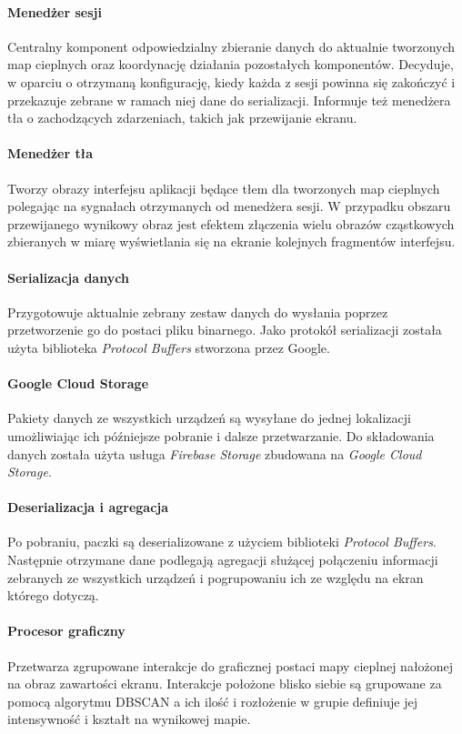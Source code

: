 \paragraph{Menedżer sesji} 
\label{par:rs_session_manager}
Centralny komponent odpowiedzialny zbieranie danych do aktualnie tworzonych map cieplnych oraz koordynację działania pozostałych komponentów. Decyduje, w oparciu o otrzymaną konfigurację, kiedy każda z sesji powinna się zakończyć i przekazuje zebrane w ramach niej dane do serializacji. Informuje też menedżera tła o zachodzących zdarzeniach, takich jak przewijanie ekranu.

\paragraph{Menedżer tła} 
\label{par:rs_bg_manager}
Tworzy obrazy interfejsu aplikacji będące tłem dla tworzonych map cieplnych polegając na sygnałach otrzymanych od menedżera sesji. W przypadku obszaru przewijanego wynikowy obraz jest efektem złączenia wielu  obrazów cząstkowych zbieranych w miarę wyświetlania się na ekranie kolejnych fragmentów interfejsu.

\paragraph{Serializacja danych}
Przygotowuje aktualnie zebrany zestaw danych do wysłania poprzez przetworzenie go do postaci pliku binarnego. Jako protokół serializacji została użyta biblioteka {\it Protocol Buffers} stworzona przez Google.

\paragraph{Google Cloud Storage}
Pakiety danych ze wszystkich urządzeń są wysyłane do jednej lokalizacji umożliwiając ich późniejsze pobranie i dalsze przetwarzanie. Do składowania danych została użyta usługa {\it Firebase Storage} zbudowana na {\it Google Cloud Storage}.

\paragraph{Deserializacja i agregacja}
Po pobraniu, paczki są deserializowane z użyciem biblioteki {\it Protocol Buffers}. Następnie otrzymane dane podlegają agregacji służącej połączeniu informacji zebranych ze wszystkich urządzeń i pogrupowaniu ich ze względu na ekran którego dotyczą.

\paragraph{Procesor graficzny} 
\label{par:rs_graphical_processor}
Przetwarza zgrupowane interakcje do graficznej postaci mapy cieplnej nałożonej na obraz zawartości ekranu. Interakcje położone blisko siebie są grupowane za pomocą algorytmu DBSCAN \cite{DBSCAN_Wiki} a ich ilość i rozłożenie w grupie definiuje jej intensywność i kształt na wynikowej mapie.
